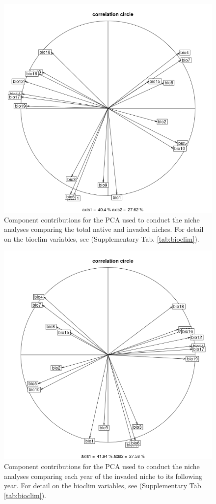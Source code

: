 \begin{figure}[!h]
    \centering
    \includegraphics[width = 0.68\linewidth]{"../../R/figures/as-eu-pca.png"}
    \caption{\label{fig:as_eu_niche_pca} Component contributions for the PCA used to conduct the niche analyses comparing the total native and invaded niches. For detail on the bioclim variables, see (Supplementary Tab. \ref{tab:bioclim}).}
\end{figure}

\begin{figure}[!h]
    \centering
    \includegraphics[width = 0.68\linewidth]{"../../R/figures/eu-years-pca.png"}
    \caption{\label{fig:eu_years_pca} Component contributions for the PCA used to conduct the niche analyses comparing each year of the invaded niche to its  following year. For detail on the bioclim variables, see (Supplementary Tab. \ref{tab:bioclim}).}
\end{figure}


